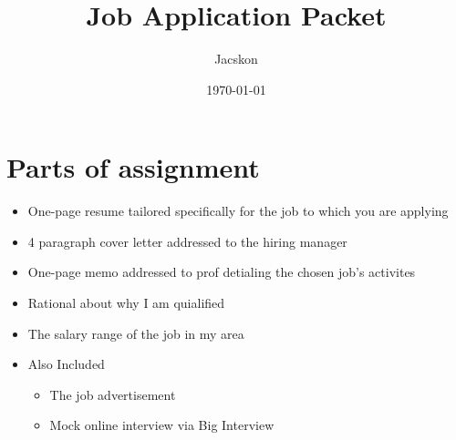 \documentclass[11pt]{article}
\author{Jacskon}
\date{\today}
\title{Job Application Packet}
\begin{document}
\maketitle
\tableofcontents

\section{Parts of assignment}
\label{sec:orgca4c74e}
\begin{itemize}
\item One-page resume tailored specifically for the job to which you are applying
\item 4 paragraph cover letter addressed to the hiring manager
\item One-page memo addressed to prof detialing the chosen job's activites
\item Rational about why I am quialified
\item The salary range of the job in my area
\item Also Included
\begin{itemize}
\item The job advertisement
\item Mock online interview via Big Interview
\end{itemize}
\end{itemize}
\end{document}
